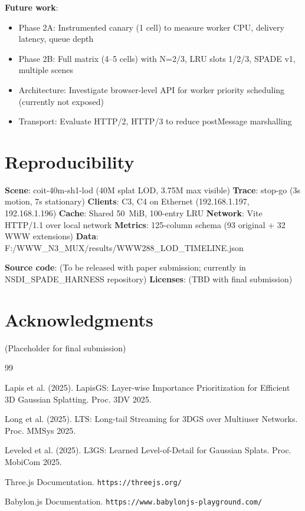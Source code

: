 \documentclass[sigconf,anonymous,review]{acmart}
\begin{document}
\textbf{Future work}:
\begin{itemize}
  \item Phase 2A: Instrumented canary (1 cell) to measure worker CPU, delivery latency, queue depth
  \item Phase 2B: Full matrix (4--5 cells) with N=2/3, LRU slots 1/2/3, SPADE v1, multiple scenes
  \item Architecture: Investigate browser-level API for worker priority scheduling (currently not exposed)
  \item Transport: Evaluate HTTP/2, HTTP/3 to reduce postMessage marshalling
\end{itemize}

\section{Reproducibility}

\textbf{Scene}: coit-40m-sh1-lod (40M splat LOD, 3.75M max visible)
\textbf{Trace}: stop-go (3s motion, 7s stationary)
\textbf{Clients}: C3, C4 on Ethernet (192.168.1.197, 192.168.1.196)
\textbf{Cache}: Shared 50~MiB, 100-entry LRU
\textbf{Network}: Vite HTTP/1.1 over local network
\textbf{Metrics}: 125-column schema (93 original + 32 WWW extensions)
\textbf{Data}: F:/WWW_N3_MUX/results/WWW288\_LOD\_TIMELINE.json

\textbf{Source code}: (To be released with paper submission; currently in NSDI\_SPADE\_HARNESS repository)
\textbf{Licenses}: (TBD with final submission)

\section*{Acknowledgments}
(Placeholder for final submission)


\begin{thebibliography}{99}

Lapis et al. (2025). LapisGS: Layer-wise Importance Prioritization for Efficient 3D Gaussian Splatting. Proc. 3DV 2025.

Long et al. (2025). LTS: Long-tail Streaming for 3DGS over Multiuser Networks. Proc. MMSys 2025.

Leveled et al. (2025). L3GS: Learned Level-of-Detail for Gaussian Splats. Proc. MobiCom 2025.

Three.js Documentation. \texttt{https://threejs.org/}

Babylon.js Documentation. \texttt{https://www.babylonjs-playground.com/}

\end{thebibliography}
\end{document}
